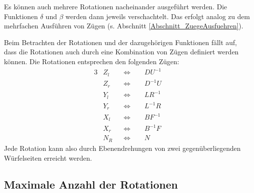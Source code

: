 \documentclass[12pt,a4paper, usenames, dvipsnames]{article}
\theoremstyle{mystyle}
\theoremstyle{definition}
\begin{document}
Es können auch mehrere Rotationen nacheinander ausgeführt werden. Die Funktionen $\delta$ und $\beta$ werden dann jeweils verschachtelt. Das erfolgt analog zu dem mehrfachen Ausführen von Zügen (s. Abschnitt \ref{Abschnitt_ZuegeAusfuehren}).

Beim Betrachten der Rotationen und der dazugehörigen Funktionen fällt auf, dass die Rotationen auch durch eine Kombination von Zügen definiert werden können. Die Rotationen entsprechen den folgenden Zügen:
\begin{alignat*}{3}
& Z_l && \Leftrightarrow \ \ &&  D U^{-1} \\
& Z_r && \Leftrightarrow &&  D^{-1} U \\
& Y_l && \Leftrightarrow && L R^{-1} \\
& Y_r && \Leftrightarrow && L^{-1} R  \\
& X_l && \Leftrightarrow && B F^{-1} \\
& X_r && \Leftrightarrow && B^{-1} F  \\
& N_R && \Leftrightarrow && N 
\end{alignat*}
Jede Rotation kann also durch Ebenendrehungen von zwei gegenüberliegenden Würfelseiten erreicht werden.



%
%
%
%
%
%
%
%
%
%
%
%
%
%
%
%
%
%
%

\subsection{Maximale Anzahl der Rotationen}
\label{Abschnitt_MaxAnzahlRotationen}
\end{document}
